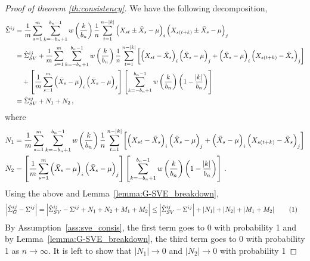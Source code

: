 \documentclass[11pt]{article}
\newcommand\numberthis{\addtocounter{equation}{1}\tag{\theequation}}
\theoremstyle{remark}
\begin{document}
%
\begin{proof}[Proof of theorem \ref{th:consistency}]
We have the following decomposition,
\begin{align*}
\tilde{\Sigma}^{ij}
    & = \dfrac{1}{m}\sum_{s=1}^{m}\sum_{k=-b_n+1}^{b_n-1}w\left(\dfrac{k}{b_n}\right)\dfrac{1}{n}\sum_{t=1}^{n-|k|}  \left(X_{st} \pm \bar{X}_s - \mu \right)_i  \left(X_{s(t + k)} \pm \bar{X}_s - \mu \right)_j\\
    & = \hat{\Sigma}_{SV}^{ij} + \dfrac{1}{m}\sum_{s=1}^{m}\sum_{k=-b_n+1}^{b_n-1}w\left(\dfrac{k}{b_n}\right)\dfrac{1}{n}\sum_{t=1}^{n-|k|}\left[ \left(X_{st} - \bar{X}_s \right)_i   \left(\bar{X}_s - \mu \right)_j + \left(\bar{X}_s - \mu \right)_i  \left(X_{s(t+k)} - \bar{X}_s \right)_j\right]\\
    & \quad + \left[\dfrac{1}{m}  \sum_{s=1}^{m}  \left(\bar{X}_s - \mu \right)_i  \left(\bar{X}_s - \mu \right)_j \right]  \left[\sum_{k=-b_n+1}^{b_n-1}w\left(\dfrac{k}{b_n}\right)\left(1 - \dfrac{\abs{k}}{b_n}\right) \right]\\
    & = \hat{\Sigma}_{SV}^{ij} + N_1 + N_2 \,,
\end{align*}
where
\begin{align*}
N_1 & = \dfrac{1}{m}\sum_{s=1}^{m}  \sum_{k=-b_n+1}^{b_n-1}  w\left(\dfrac{k}{b_n}\right)\dfrac{1}{n}  \sum_{t=1}^{n-|k|}  \left[ \left(X_{st} - \bar{X}_s \right)_i  \left(\bar{X}_s - \mu \right)_j + \left(\bar{X}_s - \mu \right)_i  \left(X_{s(t+k)} - \bar{X}_s \right)_j\right]\\
N_2 & = \left[\dfrac{1}{m}  \sum_{s=1}^{m}  \left(\bar{X}_s - \mu \right)_i  \left(\bar{X}_s - \mu \right)_j \right]  \left[\sum_{k=-b_n+1}^{b_n-1}w\left(\dfrac{k}{b_n}\right)\left(1 - \dfrac{\abs{k}}{b_n}\right) \right]\,.
\end{align*}
%
Using the above and  Lemma~\ref{lemma:G-SVE_breakdown}, 
\begin{align*}
\left|\hat{\Sigma}_{G}^{ij} - \Sigma^{ij} \right| & = \left| \hat{\Sigma}_{SV}^{ij} - \Sigma^{ij} + N_1 + N_2 + M_1 + M_2 \right|  \leq \left| \hat{\Sigma}_{SV}^{ij} - \Sigma^{ij} \right| +  \left| N_1 \right| +  \left|N_2 \right| + \left| M_1 + M_2 \right| \numberthis \label{eq:G-SVE_full_decomp}
\end{align*}
%
By Assumption~\ref{ass:sve_consis}, the first term goes to 0 with probability 1 and by Lemma~\ref{lemma:G-SVE_breakdown}, the third term goes to 0 with probability 1 as $n \to \infty$. It is left to show that $|N_1| \to 0$ and $|N_2| \to 0$ with probability 1

\end{proof}
\end{document}
